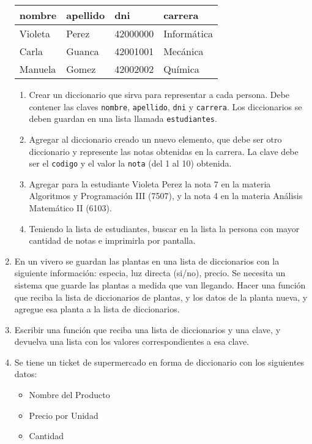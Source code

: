 \documentclass[
  letterpaper,
  DIV=11,
  numbers=noendperiod]{scrreprt}
\providecommand{\tightlist}{%
  \setlength{\itemsep}{0pt}\setlength{\parskip}{0pt}}\usepackage{longtable,booktabs,array}
\begin{document}
\begin{enumerate}
  \begin{longtable}[]{@{}llll@{}}
  \toprule\noalign{}
  nombre & apellido & dni & carrera \\
  \midrule\noalign{}
  \endhead
  \bottomrule\noalign{}
  \endlastfoot
  Violeta & Perez & 42000000 & Informática \\
  Carla & Guanca & 42001001 & Mecánica \\
  Manuela & Gomez & 42002002 & Química \\
  \end{longtable}

  \begin{enumerate}
  \def\labelenumii{\alph{enumii}.}
  \item
    Crear un diccionario que sirva para representar a cada persona. Debe
    contener las claves \texttt{nombre}, \texttt{apellido}, \texttt{dni}
    y \texttt{carrera}. Los diccionarios se deben guardan en una lista
    llamada \texttt{estudiantes}.
  \item
    Agregar al diccionario creado un nuevo elemento, que debe ser otro
    diccionario y represente las notas obtenidas en la carrera. La clave
    debe ser el \texttt{codigo} y el valor la \texttt{nota} (del 1 al
    10) obtenida.
  \item
    Agregar para la estudiante Violeta Perez la nota 7 en la materia
    Algoritmos y Programación III (7507), y la nota 4 en la materia
    Análisis Matemático II (6103).
  \item
    Teniendo la lista de estudiantes, buscar en la lista la persona con
    mayor cantidad de notas e imprimirla por pantalla.
  \end{enumerate}
\item
  En un vivero se guardan las plantas en una lista de diccionarios con
  la siguiente información: especia, luz directa (si/no), precio. Se
  necesita un sistema que guarde las plantas a medida que van llegando.
  Hacer una función que reciba la lista de diccionarios de plantas, y
  los datos de la planta nueva, y agregue esa planta a la lista de
  diccionarios.
\item
  Escribir una función que reciba una lista de diccionarios y una clave,
  y devuelva una lista con los valores correspondientes a esa clave.
\item
  Se tiene un ticket de supermercado en forma de diccionario con los
  siguientes datos:

  \begin{itemize}
  \tightlist
  \item
    Nombre del Producto
  \item
    Precio por Unidad
  \item
    Cantidad
  \end{itemize}


\end{enumerate}
\end{document}
